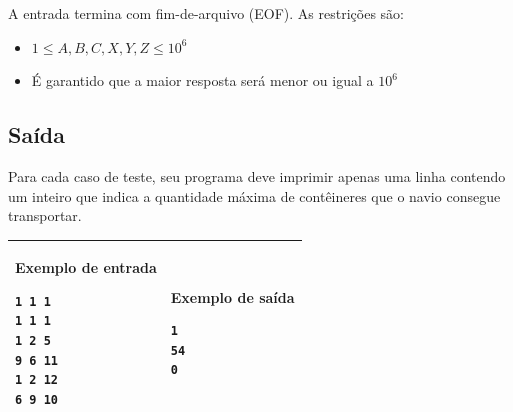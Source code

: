 A entrada termina com fim-de-arquivo (EOF). As restrições são:

\begin{itemize}
    \item $1 \leq A, B, C, X, Y, Z \leq 10^6$
    \item É garantido que a maior resposta será menor ou igual a $10^6$
\end{itemize}

\subsection*{Saída}

Para cada caso de teste, seu programa deve imprimir apenas uma linha contendo um
inteiro que indica a quantidade máxima de contêineres que o navio consegue transportar.

\begin{table}[!h]
\centering
\begin{tabular}{|l|l|}
\hline
\begin{minipage}[t]{3in}
\textbf{Exemplo de entrada}
\begin{verbatim}
1 1 1
1 1 1
1 2 5
9 6 11
1 2 12
6 9 10
\end{verbatim}
\vspace{1mm}
\end{minipage}
&

\begin{minipage}[t]{3in}
\textbf{Exemplo de saída}
\begin{verbatim}
1
54
0
\end{verbatim}
\vspace{1mm}
\end{minipage} \\
\hline
\end{tabular}
\end{table}

\newpage
